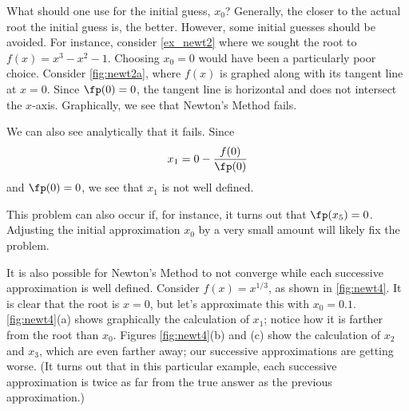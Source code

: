 What should one use for the initial guess, $x_0$?  Generally, the closer to the actual root the initial guess is, the better.  However, some initial guesses should be avoided.  For instance, consider \autoref{ex_newt2} where we sought the root to $f(x) = x^3-x^2-1$.  Choosing  $x_0=0$ would have been a particularly poor choice. Consider \autoref{fig:newt2a}, where $f(x)$ is graphed along with its tangent line at $x=0$. Since $\fp(0)=0$, the tangent line is horizontal and does not intersect the $x$-axis. Graphically, we see that Newton's Method fails.

We can also see analytically that it fails. Since
\[x_1 = 0 -\frac{f(0)}{\fp(0)}\]
and $\fp(0)=0$, we see that $x_1$ is not well defined.  

This problem can also occur if, for instance, it turns out that $\fp(x_5)=0$. Adjusting the initial approximation $x_0$ by a very small amount will likely fix the problem.

It is also possible for Newton's Method to not converge while each successive approximation is well defined. Consider $f(x) = x^{1/3}$, as shown in \autoref{fig:newt4}. It is clear that the root is $x=0$, but let's approximate this with $x_0=0.1$. \autoref{fig:newt4}(a) shows graphically the calculation of $x_1$; notice how it is farther from the root than $x_0$. Figures \ref{fig:newt4}(b) and (c) show the calculation of $x_2$ and $x_3$, which are even farther away; our successive approximations are getting worse. (It turns out that in this particular example, each successive approximation is twice as far from the true answer as the previous approximation.)

